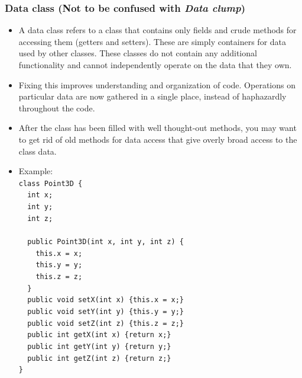 \documentclass{article}
\begin{document}
\subsubsection{Data class (Not to be confused with \textit{Data clump})}
\begin{itemize}
    \item A data class refers to a class that contains only fields and crude methods for accessing them (getters and setters). These are simply containers for data used by other classes. These classes do not contain any additional functionality and cannot independently operate on the data that they own.
    \item Fixing this improves understanding and organization of code. Operations on particular data are now gathered in a single place, instead of haphazardly throughout the code.
    \item After the class has been filled with well thought-out methods, you may want to get rid of old methods for data access that give overly broad access to the class data.
    \item Example:\\
        \lstinline|class Point3D {|\\
        \lstinline|  int x;|\\
        \lstinline|  int y;|\\
        \lstinline|  int z;|\\\\
        \lstinline|  public Point3D(int x, int y, int z) {|\\
        \lstinline|    this.x = x;|\\
        \lstinline|    this.y = y;|\\
        \lstinline|    this.z = z;|\\
        \lstinline|  }|\\
        \lstinline|  public void setX(int x) {this.x = x;}|\\
        \lstinline|  public void setY(int y) {this.y = y;}|\\
        \lstinline|  public void setZ(int z) {this.z = z;}|\\
        \lstinline|  public int getX(int x) {return x;}|\\
        \lstinline|  public int getY(int y) {return y;}|\\
        \lstinline|  public int getZ(int z) {return z;}|\\
        \lstinline|}|
\end{itemize}
\end{document}
